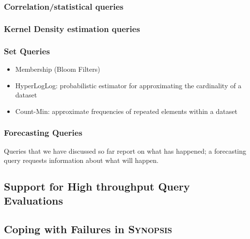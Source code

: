 \subsubsection{Correlation/statistical queries}

\subsubsection{Kernel Density estimation queries}

\subsubsection{Set Queries}
\begin{itemize}
	\item Membership (Bloom Filters)
	\item HyperLogLog: probabilistic estimator for approximating the cardinality of a dataset
	\item Count-Min: approximate frequencies of repeated elements within a dataset
\end{itemize}


\subsubsection{Forecasting Queries}
Queries that we have discussed so far report on what has happened; a forecasting query requests information about what will happen.

\subsection{Support for High throughput Query Evaluations}

\subsection{Coping with Failures in \textsc{Synopsis}}


